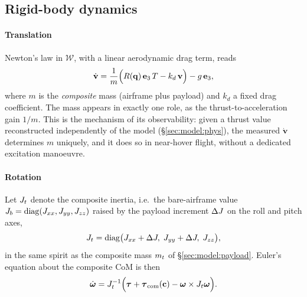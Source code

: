 \subsection{Rigid-body dynamics}\label{sec:model:dyn}

\paragraph{Translation} Newton's law in $\mathcal{W}$, with a linear
aerodynamic drag term, reads
\begin{equation}
\dot{\mathbf{v}} = \frac{1}{m}\Bigl( R(\mathbf{q})\, \mathbf{e}_3\, T - k_d\, \mathbf{v} \Bigr) - g\, \mathbf{e}_3,
\label{eq:trans}
\end{equation}
where $m$ is the \emph{composite} mass (airframe plus payload) and $k_d$ a
fixed drag coefficient. The mass appears in exactly one role, as the
thrust-to-acceleration gain $1/m$. This is the mechanism of its
observability: given a thrust value reconstructed independently of the
model (\S\ref{sec:model:phys}), the measured $\dot{\mathbf{v}}$ determines
$m$ uniquely, and it does so in near-hover flight, without a dedicated
excitation manoeuvre.

\paragraph{Rotation} Let $J_t$ denote the composite inertia, i.e.\ the
bare-airframe value $J_b = \mathrm{diag}(J_{xx}, J_{yy}, J_{zz})$ raised by
the payload increment $\Delta J$ on the roll and pitch axes,
\begin{equation}
J_t = \mathrm{diag}\bigl(J_{xx} + \Delta J,\; J_{yy} + \Delta J,\; J_{zz}\bigr),
\label{eq:Jt}
\end{equation}
in the same spirit as the composite mass $m_t$ of
\S\ref{sec:model:payload}. Euler's equation about the composite CoM is
then
\begin{equation}
\dot{\boldsymbol{\omega}} = J_t^{-1}\Bigl( \boldsymbol{\tau} + \boldsymbol{\tau}_{\mathrm{com}}(\mathbf{c}) - \boldsymbol{\omega} \times J_t \boldsymbol{\omega} \Bigr).
\label{eq:rot}
\end{equation}


